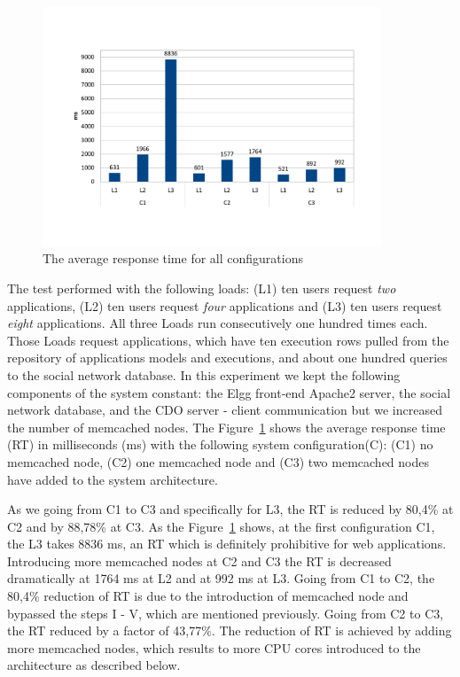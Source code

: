 \begin{figure}[h]
	\centering
	\includegraphics[width=0.9\textwidth,natwidth=200,natheight=150]{./fig/RTavg.pdf}
	\caption{The average response time for all configurations}
	\label{fig:rtavg}
\end{figure}

The test performed with the following loads: (L1) ten users request \emph{two} applications, (L2) ten users request \emph{four} applications and (L3) ten users request \emph{eight} applications. All three Loads run consecutively one hundred times each. Those Loads request applications, which have ten execution rows pulled from the repository of applications models and executions, and about one hundred queries to the social network database. In this experiment we kept the following components of the system constant: the Elgg front-end Apache2 server, the social network database, and the CDO server - client communication but we increased the number of memcached nodes.
The Figure~\ref{fig:rtavg} shows the  average response time (RT) in milliseconds (ms) with the following system configuration(C): (C1) no memcached node, (C2) one memcached node and (C3) two memcached nodes have added to the system architecture.

As we going from C1 to C3 and specifically for L3, the RT is reduced by 80,4\% at C2 and by 88,78\% at C3. As the Figure~\ref{fig:rtavg} shows, at the first configuration C1, the L3 takes 8836 ms, an RT which is definitely prohibitive for web applications. Introducing more memcached nodes at C2 and C3 the RT is decreased dramatically at 1764 ms at L2 and at 992 ms at L3. Going from C1 to C2, the 80,4\% reduction of RT is due to the introduction of memcached node and bypassed the steps I - V, which are mentioned previously. Going from C2 to C3, the RT reduced by a factor of 43,77\%. The reduction of RT is achieved by adding more memcached nodes, which results to more CPU cores introduced to the architecture as described below.

